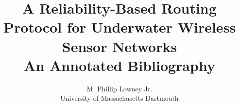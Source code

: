 \documentclass [11pt]{article}
\title{A Reliability-Based Routing Protocol for Underwater Wireless Sensor Networks\\\medskip An Annotated Bibliography}
\author{M. Phillip Lowney Jr.\\University of Massachusetts Dartmouth}
\begin{document}
\maketitle
\nocite{*}


\end{document}
